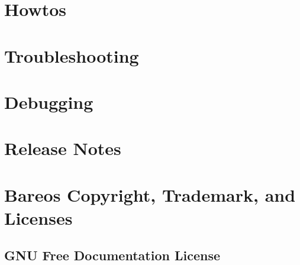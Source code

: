 \documentclass[10pt,a4paper]{book}
\begin{document}
%











\chapter{Howtos}





\chapter{Troubleshooting}


\chapter{Debugging}


\chapter{Release Notes}


\chapter{Bareos Copyright, Trademark, and Licenses}
\label{LicenseChapter}

    

\pagebreak
\section{GNU Free Documentation License}
    \label{fdl}
    
\end{document}
